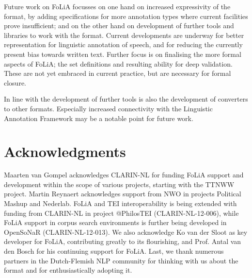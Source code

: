 \documentclass[a4paper,10pt,twoside]{article}
\begin{document}
Future work on FoLiA focusses on one hand on increased expressivity of the
format, by adding specifications for more annotation types where current
facilities prove insufficient; and on the other hand on development of further
tools and libraries to work with the format. Current developments are
underway for better representation for linguistic annotation of speech, and for 
reducing the currently present bias towards written text. Further focus is on
finalising the more formal aspects of FoLiA; the set definitions and resulting
ability for deep validation. These are not yet embraced in current practice,
but are necessary for formal closure.

In line with the development of further tools is also the development of
converters to other formats. Especially increased connectivity with the
Linguistic Annotation Framework may be a notable point for future work.

\section{Acknowledgments}

Maarten van Gompel acknowledges CLARIN-NL for funding FoLiA support and
development within the scope of various projects, starting with the TTNWW
project. Martin Reynaert acknowledges support from NWO in projects Political
Mashup and Nederlab. FoLiA and TEI interoperability is being extended with
funding from CLARIN-NL in project @PhilosTEI (CLARIN-NL-12-006), while FoLiA
support in corpus search environments is further being developed in OpenSoNaR
(CLARIN-NL-12-013). We also acknowledge Ko van der Sloot as key developer for
FoLiA, contributing greatly to its flourishing, and Prof. Antal van den Bosch for his
continuing support for FoLiA. Last, we thank numerous partners in
the Dutch-Flemish NLP community for thinking with us about the format and for
enthusiastically adopting it.  


 
  
\end{document}
